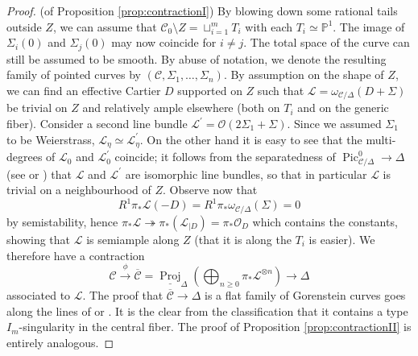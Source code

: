 \documentclass[11pt]{amsart}
\newcommand{\PP}{\mathbb P}
\newcommand{\OO}{\mathcal O}
\renewcommand{\to}{\rightarrow}
\newcommand{\dvr}{\Delta}
\newcommand{\Pic}{\operatorname{Pic}}
\theoremstyle{plain}
\theoremstyle{definition}
\begin{document}
\begin{proof}(of Proposition \ref{prop:contractionI})
 By blowing down some rational tails outside $Z$, we can assume that $\mathcal C_0\setminus Z=\sqcup_{i=1}^m T_i$ with each $T_i\simeq\PP^1$. The image of $\Sigma_i(0)$ and $\Sigma_j(0)$ may now coincide for $i\neq j$. The total space of the curve can still be assumed to be smooth. By abuse of notation, we denote the resulting family of pointed curves by $(\mathcal C,\Sigma_1,\ldots,\Sigma_n)$. By assumption on the shape of $Z$, we can find an effective Cartier $D$ supported on $Z$ such that $\mathcal L=\omega_{\mathcal C/\dvr}(D+\Sigma)$ be trivial on $Z$ and relatively ample elsewhere (both on $T_i$ and on the generic fiber). Consider a second line bundle $\mathcal L^\prime=\OO(2\Sigma_1+\Sigma)$. Since we assumed $\Sigma_1$ to be Weierstrass, $\mathcal L_\eta\simeq\mathcal L^\prime_\eta$. On the other hand it is easy to see that the multi-degrees of $\mathcal L_0$ and $\mathcal L^\prime_0$ coincide; it follows from the separatedness of $\Pic^0_{\mathcal C/\dvr}\to\dvr$ (see \cite[p. 136]{Deligne} or \cite[\S 9.4]{BLR}) that $\mathcal L$ and $\mathcal L^\prime$ are isomorphic line bundles, so that in particular $\mathcal L$ is trivial on a neighbourhood of $Z$. Observe now that 
 \[R^1\pi_*\mathcal L(-D)= R^1\pi_*\omega_{\mathcal C/\dvr}(\Sigma)=0\]
 by semistability, hence $\pi_*\mathcal L\twoheadrightarrow \pi_*(\mathcal L_{|D})=\pi_*\OO_D$ which contains the constants, showing that $\mathcal L$ is semiample along $Z$ (that it is along the $T_i$ is easier). We therefore have a contraction
 \[\mathcal C\xrightarrow{\phi}\overline{\mathcal C}=\underline{\operatorname{Proj}}_\dvr\left(\bigoplus_{n\geq 0}\pi_*\mathcal L^{\otimes n}\right)\to\dvr\]
 associated to $\mathcal L$. The proof that $\overline{\mathcal C}\to \dvr$ is a flat family of Gorenstein curves goes along the lines of \cite[Lemma 2.13]{SMY1} or \cite[Proposition 3.7.3.1]{RSPW1}. It is the clear from the classification that it contains a type $I_m$-singularity in the central fiber. The proof of Proposition \ref{prop:contractionII} is entirely analogous.
\end{proof}
\end{document}
